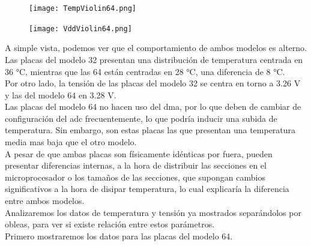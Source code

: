 \documentclass[spanish]{template/minim}
\begin{document}
\begin{figure}[H]
    \centering

    \texttt{[image: TempViolin64.png]}

\end{figure}


\begin{figure}[H]
    \centering

    \texttt{[image: VddViolin64.png]}

\end{figure}

A simple vista, podemos ver que el comportamiento de ambos modelos es alterno. Las placas del modelo 32 presentan una distribución de temperatura centrada en 36 \si{\celsius}, mientras que las 64 están centradas en 28 \si{\celsius}, una diferencia de 8 \si{\celsius}.\\

Por otro lado, la tensión de las placas del modelo 32 se centra en torno a 3.26 V y las del modelo 64 en 3.28 V.\\

Las placas del modelo 64 no hacen uso del \gls{dma}, por lo que deben de cambiar de configuración del \gls{adc} frecuentemente, lo que podría inducir una subida de temperatura. Sin embargo, son estas placas las que presentan una temperatura media mas baja que el otro modelo.\\

A pesar de que ambas placas son físicamente idénticas por fuera, pueden presentar diferencias internas, a la hora de distribuir las secciones en el microprocesador o los tamaños de las secciones, que supongan cambios significativos a la hora de disipar temperatura, lo cual explicaría la diferencia entre ambos modelos.\\


Analizaremos los datos de temperatura y tensión ya mostrados separándolos por obleas, para ver si existe relación entre estos parámetros.\\

Primero mostraremos los datos para las placas del modelo 64.\\
\end{document}
